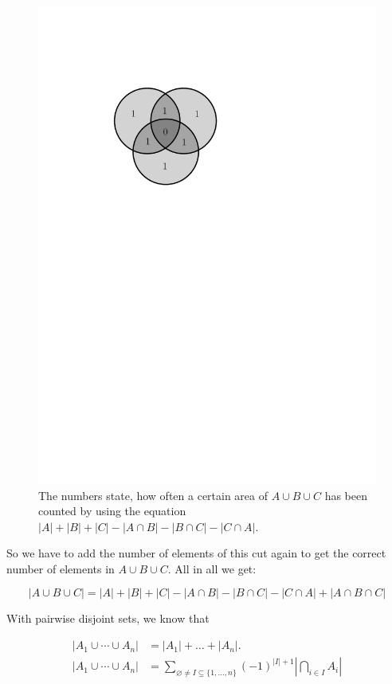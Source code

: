 \begin{figure}[htb]
	\centering
	\includegraphics[scale=.5]{02_higher_combinatorics/pics/a_cut_b_cut_c_2.pdf}
	\caption{The numbers state, how often a certain area of $A \cup B \cup C$ has been counted by using the equation $|A| + |B| + |C| - |A \cap B| - |B \cap C| - |C \cap A|.$}
\end{figure}

So we have to add the number of elements of this cut again to get the correct number of elements in $A \cup B \cup C$.
All in all we get:

\[
	|A \cup B \cup C| = |A| + |B| + |C| - |A \cap B| - |B \cap C| - |C \cap A| + |A \cap B \cap C|
\]


With pairwise disjoint sets, we know that

\begin{align*}
|A_1\cup \cdots\cup A_n| &= |A_1| + \ldots + |A_n|.\\
|A_1\cup \cdots\cup A_n| &=
    \sum_{\varnothing\neq I\subseteq\{1,\ldots,n\}}
            (-1)^{|I|+1}
            \left|
            \bigcap_{i\in I} A_i
        \right|
\end{align*}

